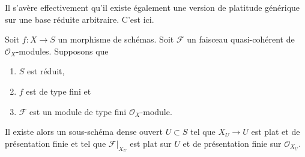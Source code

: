 \noindent
Il s'avère effectivement qu'il existe également une version de platitude
générique sur une base réduite arbitraire. C'est ici.

\begin{proposition}
\label{proposition-generic-flatness-reduced}
Soit $f : X \to S$ un morphisme de schémas. Soit
$\mathcal{F}$ un faisceau quasi-cohérent de $\mathcal{O}_X$-modules. Supposons
que
\begin{enumerate}
\item $S$ est réduit,
\item $f$ est de type fini et
\item $\mathcal{F}$ est un module de type fini $\mathcal{O}_X$-module.
\end{enumerate}
Il existe alors un sous-schéma dense ouvert $U \subset S$ tel que
$X_U \to U$ est plat et de présentation finie et tel
que $\mathcal{F}|_{X_U}$ est plat sur $U$ et de présentation
finie sur $\mathcal{O}_{X_U}$.
\end{proposition}

